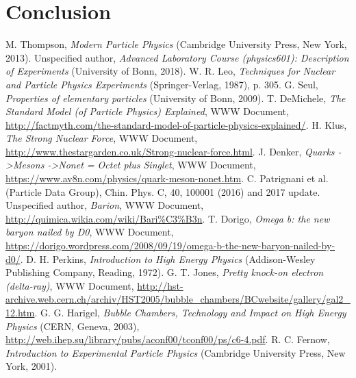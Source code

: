 \documentclass[twocolumn]{article}
\begin{document}
\section{Conclusion}

\begin{thebibliography}{9}
M. Thompson, \textsl{Modern Particle Physics} (Cambridge University Press, New York, 2013).
Unspecified author, \textsl{Advanced Laboratory Course (physics601): Description of Experiments} (University of Bonn, 2018).
W. R. Leo, \textsl{Techniques for Nuclear and Particle Physics Experiments} (Springer-Verlag, 1987), p. 305.
G. Seul, \textsl{Properties of elementary particles} (University of Bonn, 2009).
T. DeMichele, \textit{The Standard Model (of Particle Physics) Explained}, WWW Document, \url{http://factmyth.com/the-standard-model-of-particle-physics-explained/}.
H. Klus, \textit{The Strong Nuclear Force}, WWW Document, \url{http://www.thestargarden.co.uk/Strong-nuclear-force.html}.
J. Denker, \textit{Quarks -\textgreater Mesons -\textgreater Nonet = Octet plus Singlet}, WWW Document, \url{https://www.av8n.com/physics/quark-meson-nonet.htm}.
C. Patrignani et al. (Particle Data Group), Chin. Phys. C, 40, 100001 (2016) and 2017 update.
Unspecified author, \textit{Barion}, WWW Document, \url{http://quimica.wikia.com/wiki/Bari\%C3\%B3n}.
T. Dorigo, \textit{Omega b: the new baryon nailed by D0}, WWW Document, \url{https://dorigo.wordpress.com/2008/09/19/omega-b-the-new-baryon-nailed-by-d0/}.
D. H. Perkins, \textsl{Introduction to High Energy Physics} (Addison-Wesley Publishing Company, Reading, 1972).
G. T. Jones, \textsl{Pretty knock-on electron (delta-ray)}, WWW Document, \url{http://hst-archive.web.cern.ch/archiv/HST2005/bubble_chambers/BCwebsite/gallery/gal2_12.htm}.
G. G. Harigel, \textsl{Bubble Chambers, Technology and Impact on High Energy Physics} (CERN, Geneva, 2003), \url{http://web.ihep.su/library/pubs/aconf00/tconf00/ps/c6-4.pdf}.
R. C. Fernow, \textsl{Introduction to Experimental Particle Physics} (Cambridge University Press, New York, 2001).


\end{thebibliography}
\end{document}
